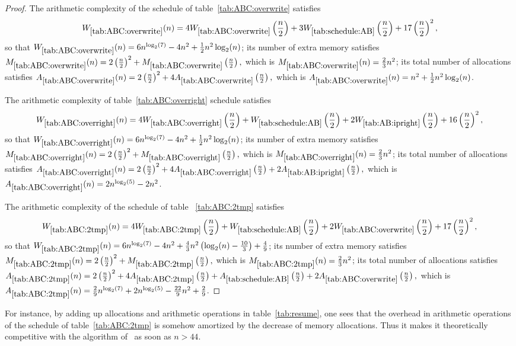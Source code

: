 \documentclass{article}
\begin{document}
\begin{proof}
The arithmetic complexity of the schedule of table~\ref{tab:ABC:overwrite} satisfies
$$W_{\ref{tab:ABC:overwrite}}(n) = 4
W_{\ref{tab:ABC:overwrite}}\left(\frac{n}{2}\right) +
3W_{\ref{tab:schedule:AB}}\left(\frac{n}{2}\right)+17\left(\frac{n}{2}\right)^2,
$$ so that
$W_{\ref{tab:ABC:overwrite}}(n) = 6n^{\log_2(7)}-4n^2+\frac{1}{2}n^{2}\log_2(n)$;
its number of extra memory satisfies
$
M_{\ref{tab:ABC:overwrite}}(n) = 2\left(\frac{n}{2}\right)^2 +
M_{\ref{tab:ABC:overwrite}}\left(\frac{n}{2}\right),
$ which is $M_{\ref{tab:ABC:overwrite}}(n)=\frac{2}{3}n^2$;
its total number of allocations satisfies
$A_{\ref{tab:ABC:overwrite}}(n) = 2\left(\frac{n}{2}\right)^2 +
4A_{\ref{tab:ABC:overwrite}}\left(\frac{n}{2}\right),
$ which is
$A_{\ref{tab:ABC:overwrite}}(n)=n^2+\frac{1}{2}n^{2}\log_2(n)$.

The arithmetic complexity of table~\ref{tab:ABC:overright} schedule satisfies
$$W_{\ref{tab:ABC:overright}}(n) = 4
W_{\ref{tab:ABC:overright}}\left(\frac{n}{2}\right) +
W_{\ref{tab:schedule:AB}}\left(\frac{n}{2}\right) +
2W_{\ref{tab:AB:ipright}}\left(\frac{n}{2}\right) +
16\left(\frac{n}{2}\right)^2,
$$ so that
$W_{\ref{tab:ABC:overright}}(n) = 6n^{\log_2(7)}-4n^2+\frac{1}{2}n^{2}\log_2(n)$;
its number of extra memory satisfies
$
M_{\ref{tab:ABC:overright}}(n) = 2\left(\frac{n}{2}\right)^2 +
M_{\ref{tab:ABC:overright}}\left(\frac{n}{2}\right),
$ which is $M_{\ref{tab:ABC:overright}}(n)=\frac{2}{3}n^2$;
its total number of allocations satisfies
$A_{\ref{tab:ABC:overright}}(n) = 2\left(\frac{n}{2}\right)^2 +
4A_{\ref{tab:ABC:overright}}\left(\frac{n}{2}\right) +
2A_{\ref{tab:AB:ipright}}\left(\frac{n}{2}\right),
$ which is
$A_{\ref{tab:ABC:overright}}(n)=2n^{\log_2(5)}-2n^2$.

The arithmetic complexity of the schedule of table ~\ref{tab:ABC:2tmp} satisfies
$$
W_{\ref{tab:ABC:2tmp}}(n)=4W_{\ref{tab:ABC:2tmp}}\left(\frac{n}{2}\right) +
W_{\ref{tab:schedule:AB}}\left(\frac{n}{2}\right) +
2W_{\ref{tab:ABC:overwrite}}\left(\frac{n}{2}\right) +
17\left(\frac{n}{2}\right)^2,
$$ so that
$W_{\ref{tab:ABC:2tmp}}(n)=6n^{\log_2(7)}-4n^2+\frac{4}{3}n^2\left(\log_2(n)-\frac{10}{3}\right)+\frac{4}{9}$;
its number of extra memory satisfies
$
M_{\ref{tab:ABC:2tmp}}(n) = 2\left(\frac{n}{2}\right)^2 +
M_{\ref{tab:ABC:2tmp}}\left(\frac{n}{2}\right),
$
which is $M_{\ref{tab:ABC:2tmp}}(n)=\frac{2}{3}n^2$;
its total number of allocations satisfies
$
A_{\ref{tab:ABC:2tmp}}(n) = 2\left(\frac{n}{2}\right)^2 + 4A_{\ref{tab:ABC:2tmp}}\left(\frac{n}{2}\right)+A_{\ref{tab:schedule:AB}}\left(\frac{n}{2}\right)+2A_{\ref{tab:ABC:overwrite}}\left(\frac{n}{2}\right),
$
which is $A_{\ref{tab:ABC:2tmp}}(n)=\frac{2}{9}n^{\log_2(7)}+2n^{\log_2(5)}-\frac{22}{9}n^2+\frac{2}{9}$.
\end{proof}
For instance, by adding up allocations and arithmetic operations in table~\ref{tab:resume},
one sees that the overhead in arithmetic operations of the schedule of table~\ref{tab:ABC:2tmp}
is somehow amortized by the decrease of memory allocations. Thus it makes it
theoretically competitive with the algorithm
of~\cite{Huss-Lederman:1996:mai} as soon as $n > 44$.
\end{document}
